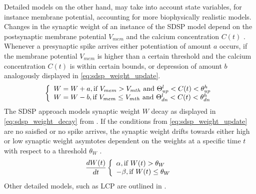 Detailed models on the other hand, may take into account state variables, for instance membrane potential, 
accounting for more biophysically realistic models.
Changes in the synaptic weight of an instance of the \ac{SDSP} model depend on the postsynaptic membrane potential $V_{mem}$ and 
the calcium concentration $C(t)$ \cite{Synaptic_plasticity}.
Whenever a presynaptic spike arrives either potentiation of amount $a$ occurs, if the membrane potential $V_{mem}$ is higher than a certain threshold and the 
calcium concentration $C(t)$ is within certain bounds, or depression of amount $b$ analogously displayed in \autoref{eq:sdsp_weight_update}.
%
\begin{equation}
    \centering
    \label{eq:sdsp_weight_update}
    \left\{
    \begin{array}{ll}
        W = W + a, \text{if } V_{mem} > V_{mth} \text{ and } \Theta^l_{up} < C(t) < \theta^h_{up}\\
        W = W - b, \text{if } V_{mem} \le V_{mth} \text{ and } \Theta^l_{dn} < C(t) < \theta^h_{dn}
    \end{array}
    \right.
\end{equation}
%
The \ac{SDSP} approach models synaptic weight $W$ decay as displayed in \autoref{eq:sdsp_weight_decay} from \cite{Synaptic_plasticity}.
If the conditions from \autoref{eq:sdsp_weight_update} are no saisfied or no spike arrives, 
the synaptic weight drifts towards either high or low synaptic weight asymtotes dependent on the weights at a specific time $t$ 
with respect to a threshold $\theta_W$ \cite{Synaptic_plasticity}.
%
\begin{equation}
    \centering
    \label{eq:sdsp_weight_decay}
    \frac{dW(t)}{dt}
    \left\{
    \begin{array}{ll}
        \alpha, \text{if } W(t) > \theta_W\\
        - \beta, \text{if } W(t) \le \theta_W\\
    \end{array}
    \right.
\end{equation}
%
Other detailed models, such as \ac{LCP} are outlined in \cite{Synaptic_plasticity}.

